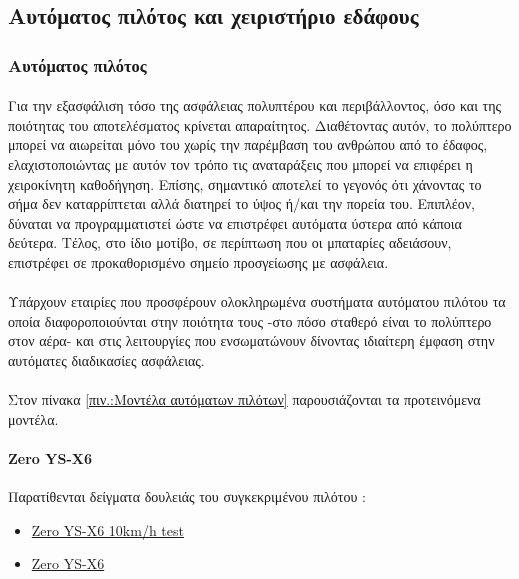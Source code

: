 \documentclass[a4paper, 12pt, twoside]{report}
\begin{document}
{{{{{{		\subsection{Αυτόματος πιλότος και χειριστήριο εδάφους}
		
			\subsubsection{Αυτόματος πιλότος}
			\paragraph{}{Για την εξασφάλιση τόσο της ασφάλειας πολυπτέρου και περιβάλλοντος, όσο και της ποιότητας του αποτελέσματος κρίνεται απαραίτητος. Διαθέτοντας αυτόν, το πολύπτερο μπορεί να αιωρείται μόνο του χωρίς την παρέμβαση του ανθρώπου από το έδαφος, ελαχιστοποιώντας με αυτόν τον τρόπο τις αναταράξεις που μπορεί να επιφέρει η χειροκίνητη καθοδήγηση. Επίσης, σημαντικό αποτελεί το γεγονός ότι χάνοντας το σήμα δεν καταρρίπτεται αλλά διατηρεί το ύψος ή/και την πορεία του. Επιπλέον, δύναται να προγραμματιστεί ώστε να επιστρέφει αυτόματα ύστερα από κάποια δεύτερα. Τέλος, στο ίδιο μοτίβο, σε περίπτωση που οι μπαταρίες αδειάσουν, επιστρέφει σε προκαθορισμένο σημείο προσγείωσης με ασφάλεια.
			}
			\paragraph{}{Υπάρχουν εταιρίες που προσφέρουν ολοκληρωμένα συστήματα αυτόματου πιλότου τα οποία διαφοροποιούνται στην ποιότητα τους -στο πόσο σταθερό είναι το πολύπτερο στον αέρα- και στις λειτουργίες που ενσωματώνουν δίνοντας ιδιαίτερη έμφαση στην αυτόματες διαδικασίες ασφάλειας.
			}
			\paragraph{}{Στον πίνακα \ref{πιν.:Μοντέλα αυτόματων πιλότων} παρουσιάζονται τα προτεινόμενα μοντέλα.
			}
			
			\paragraph{Zero YS-X6}{Παρατίθενται δείγματα δουλειάς του συγκεκριμένου πιλότου :
				\begin{itemize}
					\item \href{http://www.youtube.com/watch?v=r1_O_VvFZ1U}{Zero YS-X6 10km/h test}
					\item \href{http://www.youtube.com/watch?v=JRiiGby-e-4}{Zero YS-X6}					
				\end{itemize}
			}
			
}}}}}}
\end{document}
